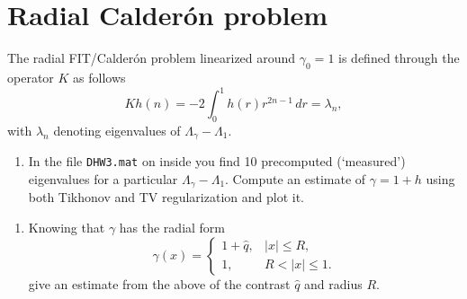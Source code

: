 \nopagebreak
\noindent\hrulefill

\section{Radial Calderón problem}%
\label{sec:radial-calderon-problem}

The radial FIT/Calderón problem linearized around $\gamma_0 = 1$ is defined through the operator $K$ as follows \[
  Kh(n) = -2\int_0^1 h(r)r^{2n-1}\,dr = \lambda_n, \tag{1}
\]
with $\lambda_n$ denoting eigenvalues of $\Lambda_\gamma - \Lambda_1$.
\begin{enumerate}[label = (\alph*)]
  \item In the file \texttt{DHW3.mat} on inside you find 10 precomputed (`measured') eigenvalues for a particular
      $\Lambda_\gamma - \Lambda_1$.
    Compute an estimate of $\gamma = 1 + h$ using both Tikhonov and TV regularization and plot it.
\end{enumerate}

\nopagebreak
\noindent\hrulefill

\begin{enumerate}[resume, label = (\alph*)]
  \item Knowing that $\gamma$ has the radial form
    \[
      \gamma(x) =
      \begin{cases}
        1 + \hat{q}, & |x| \leq R, \\
        1, & R < |x| \leq 1.
      \end{cases}
    \]
    give an estimate from the above of the contrast $\hat{q}$ and radius $R$.
\end{enumerate}
